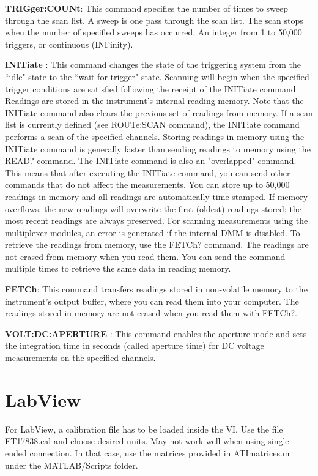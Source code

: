 \documentclass[a4paper]{article}
\begin{document}
\textbf{TRIGger:COUNt}: This command specifies the number of times to sweep through the scan list. A sweep is one pass through the scan list. The scan stops when the number of specified sweeps has occurred. An integer from 1 to 50,000 triggers, or continuous (INFinity).

\textbf{INITiate} : This command changes the state of the triggering system from the ``idle" state to the ``wait-for-trigger" state. Scanning will begin when the specified trigger conditions are satisfied following the receipt of the INITiate command. Readings are stored in the instrument's internal reading memory. Note that the INITiate command also clears the previous set of readings from memory.
If a scan list is currently defined (see ROUTe:SCAN command), the INITiate command performs a scan of the specified channels.
Storing readings in memory using the INITiate command is generally faster than sending readings to memory using the READ? command. The INITiate command is also an "overlapped" command. This means that after executing the INITiate command, you can send other commands that do not affect the measurements.
You can store up to 50,000 readings in memory and all readings are automatically time stamped. If memory overflows, the new readings will overwrite the first (oldest) readings stored; the most recent readings are always preserved.
For scanning measurements using the multiplexer modules, an error is generated if the internal DMM is disabled.
To retrieve the readings from memory, use the FETCh? command.
The readings are not erased from memory when you read them.
You can send the command multiple times to retrieve the same data in reading memory.

\textbf{FETCh}: This command transfers readings stored in non-volatile memory to the instrument's output buffer, where you can read them into your computer. The readings stored in memory are not erased when you read them with FETCh?.

\textbf{VOLT:DC:APERTURE} : This command enables the aperture mode and sets the integration time in seconds (called aperture time) for DC voltage measurements on the specified channels.


\section{LabView}

For LabView, a calibration file has to be loaded inside the VI. Use the file FT17838.cal and choose desired units. May not work well when using single-ended connection. In that case, use the matrices provided in ATImatrices.m under the MATLAB/Scripts folder.
\end{document}
